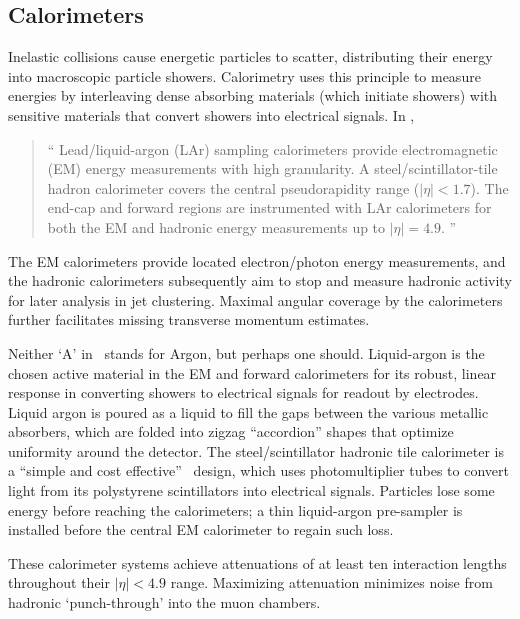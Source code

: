 \subsection{Calorimeters}
\label{sec:atlas_calo}
Inelastic collisions cause energetic particles to scatter, distributing their
energy into macroscopic particle showers.
Calorimetry uses this principle to measure energies
by interleaving dense absorbing materials (which initiate showers)
with sensitive materials that convert showers into electrical signals.
In \atlas,
\begin{quote}
``%
Lead/liquid-argon (LAr) sampling calorimeters provide electromagnetic (EM)
energy measurements with high granularity.
A steel/scintillator-tile hadron calorimeter covers the central pseudorapidity
range ($|\eta| < 1.7$).
The end-cap and forward regions are instrumented with LAr calorimeters for both
the EM and hadronic energy measurements up to $|\eta| = 4.9$.%
''~\cite{atlas2022searches}
\end{quote}
The EM calorimeters provide located electron/photon energy measurements,
and the hadronic calorimeters subsequently aim to stop and measure hadronic
activity for later analysis in jet clustering.
Maximal angular coverage by the calorimeters further facilitates missing
transverse momentum estimates.

Neither `A' in \atlas\ stands for Argon, but perhaps one should.
Liquid-argon is the chosen active material in the EM and forward calorimeters
for its robust, linear response in converting showers to electrical signals
for readout by electrodes.
Liquid argon is poured as a liquid to fill the gaps between the various
metallic absorbers, which are folded into zigzag ``accordion'' shapes that
optimize uniformity around the detector.
The steel/scintillator hadronic tile calorimeter is a
``simple and cost effective''~\cite{atlas1996tile} design, which uses
photomultiplier tubes to convert light from its polystyrene scintillators into
electrical signals.
Particles lose some energy before reaching the calorimeters; a thin
liquid-argon pre-sampler is installed before the central EM calorimeter
to regain such loss.

These calorimeter systems achieve attenuations of at least ten interaction
lengths throughout their $|\eta| < 4.9$ range.
Maximizing attenuation minimizes noise from hadronic `punch-through' into the
muon chambers.


